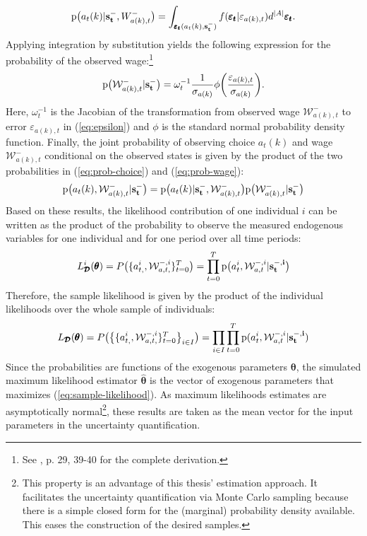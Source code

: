 \noindent
\begin{align} \label{eq:prob-choice}
\text{p}\big(a_t(k) | \bold{s_t^-},W^{-}_{a(k),t}\big) = \int_{\pmb{\varepsilon_t}(a_t(k),\bold{s_t^-})} f(\pmb{\varepsilon_t}|\varepsilon_{a(k),t}) d^{|A|} \pmb{\varepsilon_t}.
\end{align}
Applying integration by substitution yields the following expression for the probability of the observed wage:\footnote{See \cite{Raabe.2019}, p. 29, 39-40 for the complete derivation.}
\begin{align} \label{eq:prob-wage}
\text{p}\big(\mathcal{W}^{-}_{a(k),t} | \bold{s_t^-}\big) = \omega_t^{-1} \frac{1}{\sigma_{a(k)}} \phi\bigg(\frac{\varepsilon_{a(k),t}}{\sigma_{a(k)}}\bigg).
\end{align}
Here, $\omega_t^{-1}$ is the Jacobian of the transformation from observed wage $\mathcal{W}^{-}_{a(k),t}$ to error $\varepsilon_{a(k),t}$ in (\ref{eq:epsilon}) and $\phi$ is the standard normal probability density function.
Finally, the joint probability of observing choice $a_t(k)$ and wage $\mathcal{W}^{-}_{a(k),t}$ conditional on the observed states is given by the product of the two probabilities in (\ref{eq:prob-choice}) and (\ref{eq:prob-wage}):
\begin{align}
\text{p}\big(a_t(k),\mathcal{W}^{-}_{a(k),t}|\bold{s_t^-}\big) = \text{p}\big(a_t(k)|\bold{s_t^-}, \mathcal{W}^{-}_{a(k),t}\big)\text{p}\big(\mathcal{W}^{-}_{a(k),t}|\bold{s_t^-}\big)
\end{align}
Based on these results, the likelihood contribution of one individual $i$ can be written as the product of the probability to observe the measured endogenous variables for one individual and for one period over all time periods:
\begin{align}
L^{i}_{\pmb{\mathcal{D}}}(\pmb{\theta}) = P\big(\{a_{t,}^{i},\mathcal{W}^{-,i}_{a,t,}\}_{t=0}^T\big) = \prod_{t=0}^{T} \text{p}\big(a_t^{i},\mathcal{W}_{a,t}^{-,i}|\bold{s_t^{-,i}}\big)
\end{align}
Therefore, the sample likelihood is given by the product of the individual likelihoods over the whole sample of individuals:
\begin{align} \label{eq:sample-likelihood}
L_{\pmb{\mathcal{D}}}(\pmb{\theta}) = P\big(\big\{\{a_{t,}^{i},\mathcal{W}^{-,i}_{a,t,}\}_{t=0}^T\big\}_{i \in I}\big) = \prod_{i \in I}\prod_{t=0}^{T} \text{p}(a_t^{i},\mathcal{W}_{a,t}^{-,i}|\bold{s_t^{-,i})}
\end{align}
Since the probabilities are functions of the exogenous parameters $\pmb{\theta}$, the simulated maximum likelihood estimator $\pmb{\hat{\theta}}$ is the vector of exogenous parameters that maximizes (\ref{eq:sample-likelihood}). As maximum likelihoods estimates are asymptotically normal\footnote{This property is an advantage of this thesis' estimation approach. It facilitates the uncertainty quantification via Monte Carlo sampling because there is a simple closed form for the (marginal) probability density available. This eases the construction of the desired samples.}, these results are taken as the mean vector for the input parameters in the uncertainty quantification.

